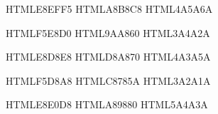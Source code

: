 %  
%
%


\definecolor{NorthernTone}   {HTML}{E8EFF5}  %
\definecolor{NorthernGrey}   {HTML}{A8B8C8}  %
\definecolor{NorthernDark}   {HTML}{4A5A6A}  %

\definecolor{SouthernTone}   {HTML}{F5E8D0}  %
\definecolor{SouthernGreen}  {HTML}{9AA860}  %
\definecolor{SouthernDark}   {HTML}{3A4A2A}  %

\definecolor{EasternTone}    {HTML}{E8D8E8}  %
\definecolor{EasternGold}    {HTML}{D8A870}  %
\definecolor{EasternDark}    {HTML}{4A3A5A}  %

\definecolor{WesternTone}    {HTML}{F5D8A8}  %
\definecolor{WesternRed}     {HTML}{C8785A}  %
\definecolor{WesternDark}    {HTML}{3A2A1A}  %

\definecolor{CentralTone}    {HTML}{E8E0D8}  %
\definecolor{CentralBrown}   {HTML}{A89880}  %
\definecolor{CentralDark}    {HTML}{5A4A3A}  %

